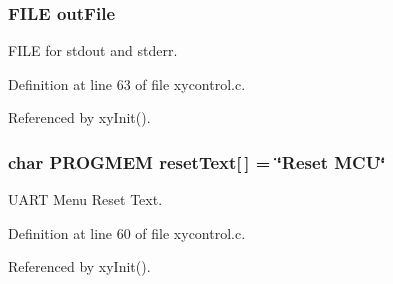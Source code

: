 \hypertarget{group__xycontrol_gaa9e0cac6f45e381f488c1dd9a8418ca2}{
\subsubsection[{out\-File}]{\setlength{\rightskip}{0pt plus 5cm}F\-I\-L\-E out\-File}}\label{group__xycontrol_gaa9e0cac6f45e381f488c1dd9a8418ca2}


F\-I\-L\-E for stdout and stderr. 



Definition at line 63 of file xycontrol.\-c.



Referenced by xy\-Init().

\hypertarget{group__xycontrol_ga27915b4caf41f74542980a4ea0f1726a}{
\subsubsection[{reset\-Text}]{\setlength{\rightskip}{0pt plus 5cm}char P\-R\-O\-G\-M\-E\-M reset\-Text\mbox{[}$\,$\mbox{]} = \char`\"{}Reset M\-C\-U\char`\"{}}}\label{group__xycontrol_ga27915b4caf41f74542980a4ea0f1726a}


U\-A\-R\-T Menu Reset Text. 



Definition at line 60 of file xycontrol.\-c.



Referenced by xy\-Init().

